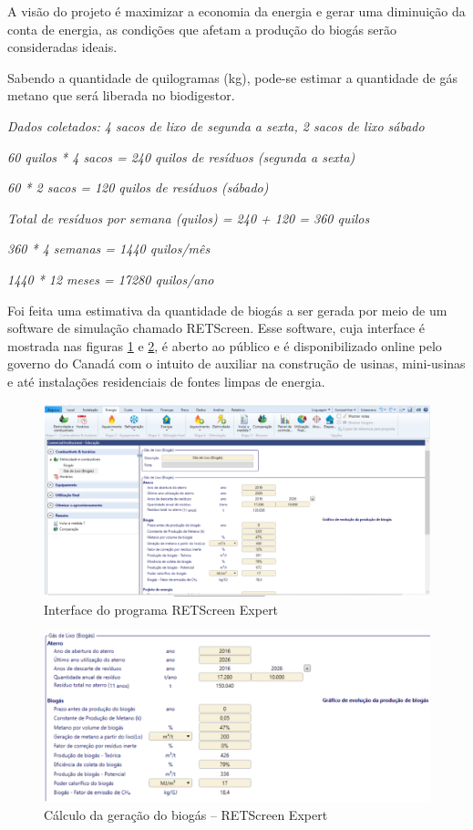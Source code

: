 A visão do projeto é maximizar a economia da energia e gerar uma diminuição da conta de energia, as condições que afetam a produção do biogás serão consideradas ideais.

Sabendo a quantidade de quilogramas (kg), pode-se estimar a quantidade de gás metano que será liberada no biodigestor.\newline

\centerline{\textit{Dados coletados: 4 sacos de lixo de segunda a sexta, 2 sacos de lixo sábado}}
\centerline{\textit{60 quilos * 4 sacos = 240 quilos de resíduos (segunda a sexta)}}
\centerline{\textit{60 * 2 sacos = 120 quilos de resíduos (sábado)}}
\centerline{\textit{Total de resíduos por semana (quilos) = 240 + 120 = 360 quilos}}
\centerline{\textit{360 * 4 semanas = 1440 quilos/mês}}
\centerline{\textit{1440 * 12 meses = 17280 quilos/ano}}


Foi feita uma estimativa da quantidade de biogás a ser gerada por meio de um software de simulação chamado RETScreen. Esse software, cuja interface é mostrada nas figuras \ref{fig:ret1} e \ref{fig:ret2}, é aberto ao público e é disponibilizado online pelo governo do Canadá com o intuito de auxiliar na construção de usinas, mini-usinas e até instalações residenciais de fontes limpas de energia.

\begin{figure}[!htb]
\centering
\includegraphics[width=0.75\paperwidth]{figuras/ret1.png}
\caption{Interface do programa RETScreen Expert}
\label{fig:ret1}
\end{figure}

\begin{figure}[!htb]
\centering
\includegraphics[width=0.75\paperwidth]{figuras/ret2.png}
\caption{Cálculo da geração do biogás – RETScreen Expert}
\label{fig:ret2}
\end{figure}

